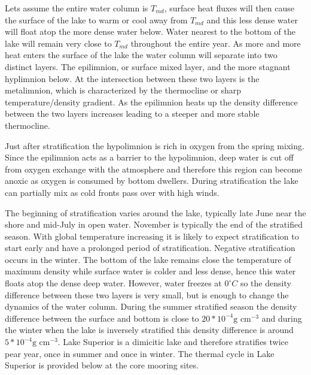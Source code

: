 

Lets assume the entire water column is  $T_{md}$, surface heat fluxes will then cause the surface of the lake to warm or cool away from $T_{md}$ and this less dense water will float atop 
the more dense water below. Water nearest to the bottom of the lake will remain very close to $T_{md}$ throughout the entire year. As more and more heat enters the surface of the lake 
the water column will separate into two distinct layers. The epilimnion, or surface mixed layer, and the more stagnant hyplimnion below. At the intersection between these two layers is the 
metalimnion, which is characterized by the thermocline or sharp temperature/density gradient. As the epilimnion heats up the density difference between the two layers increases 
leading to a steeper and more stable thermocline. 

Just after stratification the hypolimnion is rich in oxygen from the spring mixing. Since the epilimnion acts as a
barrier to the hypolimnion,  deep water is cut off from oxygen exchange with the atmosphere and therefore this region can become 
anoxic as oxygen is consumed by bottom dwellers. During stratification the lake can partially mix as cold fronts pass over with high winds. 

The beginning of stratification varies around the lake, typically late June near the shore and mid-July in open water. November is typically the end of the stratified season. 
With global temperature increasing it is likely to expect stratification to start early and have a prolonged period of stratification. Negative stratification occurs in the winter. 
The bottom of the lake remains close the temperature of maximum density while surface water is colder and less dense, hence this water floats atop the dense deep water. 
However, water freezes at $0^{\circ}C$ so the density difference between these two layers is very small, but is enough to change the dynamics of the water column. 
During the summer stratified season the density difference between the surface and bottom is close to $20*10^{-4} \text{g\ cm}^{-3}$ and during the winter when the lake is inversely stratified this
density difference is around $5*10^{-4} \text{g\ cm}^{-3}$.  Lake Superior is a dimicitic lake and therefore stratifies twice pear year, once in summer and once in winter. The thermal cycle in Lake Superior is provided below at the core mooring sites. 

